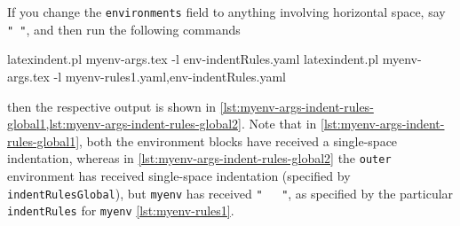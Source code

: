 \begin{example}
 If you change the \texttt{environments} field to anything involving horizontal space,
 say \lstinline!" "!, and then run the following commands 

 \begin{commandshell}
latexindent.pl myenv-args.tex -l env-indentRules.yaml
latexindent.pl myenv-args.tex -l myenv-rules1.yaml,env-indentRules.yaml
\end{commandshell}

 then the respective output is shown in
 \cref{lst:myenv-args-indent-rules-global1,lst:myenv-args-indent-rules-global2}. Note
 that in \cref{lst:myenv-args-indent-rules-global1}, both the environment blocks have
 received a single-space indentation, whereas in
 \cref{lst:myenv-args-indent-rules-global2} the \texttt{outer} environment has received
 single-space indentation (specified by \texttt{indentRulesGlobal}), but \texttt{myenv}
 has received \lstinline!"   "!, as specified by the particular \texttt{indentRules} for
 \texttt{myenv} \vref{lst:myenv-rules1}.

 \begin{cmhtcbraster}
 \end{cmhtcbraster}
 \end{example}

